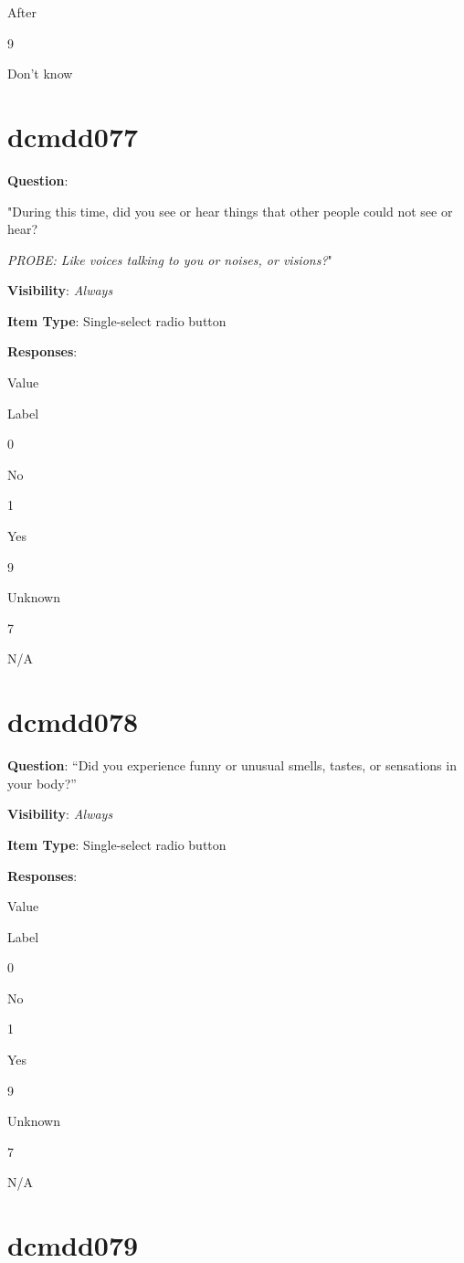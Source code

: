 \documentclass[]{book}
\begin{document}
After

9

Don't know

\hypertarget{dcmdd077}{%
\section{dcmdd077}\label{dcmdd077}}

\textbf{Question}:

"During this time, did you see or hear things that other people could not see or hear?

\emph{PROBE: Like voices talking to you or noises, or visions?}"

\textbf{Visibility}: \emph{Always}

\textbf{Item Type}: Single-select radio button

\textbf{Responses}:

Value

Label

0

No

1

Yes

9

Unknown

7

N/A

\hypertarget{dcmdd078}{%
\section{dcmdd078}\label{dcmdd078}}

\textbf{Question}: ``Did you experience funny or unusual smells, tastes, or sensations in your body?''

\textbf{Visibility}: \emph{Always}

\textbf{Item Type}: Single-select radio button

\textbf{Responses}:

Value

Label

0

No

1

Yes

9

Unknown

7

N/A

\hypertarget{dcmdd079}{%
\section{dcmdd079}\label{dcmdd079}}
\end{document}
